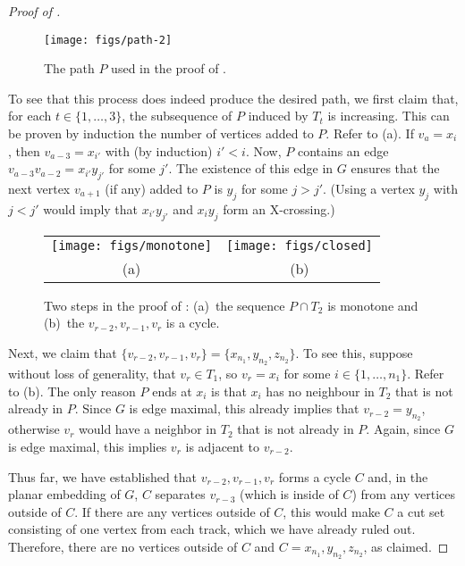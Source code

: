 \documentclass{patmorin}
\begin{document}
\begin{proof}[Proof of ]
  \begin{figure}
     \begin{center}
        \texttt{[image: figs/path-2]}
     \end{center}
     \caption{The path $P$ used in the proof of .}
  \end{figure}

  To see that this process does indeed produce the desired path, we
  first claim that, for each $t\in \{1,\ldots,3\}$, the subsequence of
  $P$ induced by $T_t$ is increasing. This can be proven by induction
  the number of vertices added to $P$. Refer to (a).
  If $v_a=x_i$, then $v_{a-3}=x_{i'}$ with (by induction) $i'< i$.
  Now, $P$ contains an edge $v_{a-3}v_{a-2}=x_{i'}y_{j'}$ for some $j'$.
  The existence of this edge in $G$ ensures that the next vertex $v_{a+1}$
  (if any) added to $P$ is $y_j$ for some $j > j'$.  (Using a vertex
  $y_j$ with $j < j'$ would imply that $x_{i'}y_{j'}$ and $x_iy_j$
  form an X-crossing.)

  \begin{figure}
    \begin{center}
       \begin{tabular}{cc}
         \texttt{[image: figs/monotone]} & \texttt{[image: figs/closed]} \\
         (a) & (b)
       \end{tabular}
    \end{center}
    \caption{Two steps in the proof of : (a)~the sequence $P\cap T_2$ is monotone and (b)~the $v_{r-2},v_{r-1},v_r$ is a cycle.}
  \end{figure}


  Next, we claim that
  $\{v_{r-2},v_{r-1},v_{r}\}=\{x_{n_1},y_{n_2},z_{n_2}\}$. To see this,
  suppose without loss of generality, that $v_r\in T_1$, so $v_r=x_i$
  for some $i\in\{1,\ldots,n_1\}$. Refer to (b). The only
  reason $P$ ends at $x_i$ is that $x_i$ has no neighbour in $T_{2}$
  that is not already in $P$.  Since $G$ is edge maximal, this already
  implies that $v_{r-2}=y_{n_2}$, otherwise $v_r$ would have a neighbor
  in $T_2$ that is not already in $P$.  Again, since $G$ is edge maximal,
  this implies $v_r$ is adjacent to $v_{r-2}$.

  Thus far, we have established that $v_{r-2},v_{r-1},v_{r}$ forms a
  cycle $C$ and, in the planar embedding of $G$, $C$ separates $v_{r-3}$
  (which is inside of $C$) from any vertices outside of $C$.  If there are
  any vertices outside of $C$, this would make $C$ a cut set consisting
  of one vertex from each track, which we have already ruled out.
  Therefore, there are no vertices outside of $C$ and 
  $C=x_{n_1},y_{n_2},z_{n_2}$, as claimed.


\end{proof}
\end{document}
